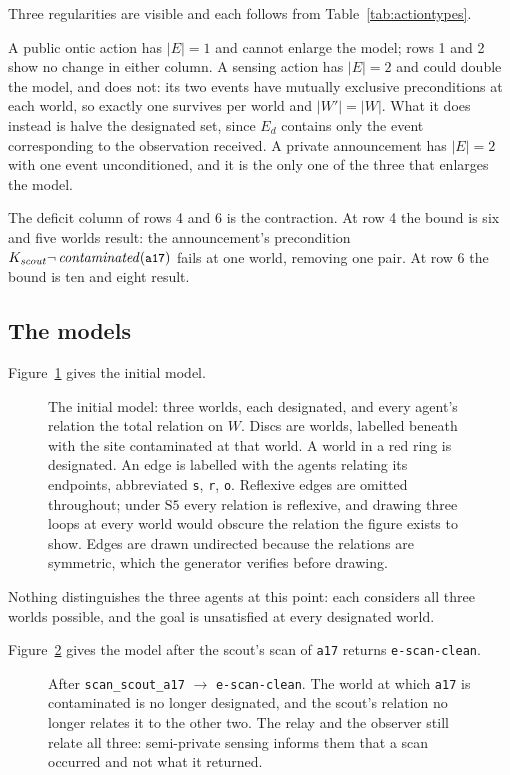 \documentclass[11pt,a4paper]{article}
\theoremstyle{definition}
\newcommand{\Kop}[1]{K_{#1}}
\newcommand{\code}[1]{\texttt{\small #1}}
\newcommand{\site}[1]{\code{#1}}
\begin{document}
Three regularities are visible and each follows from
Table~\ref{tab:actiontypes}.

A public ontic action has $|E| = 1$ and cannot enlarge the model; rows 1 and 2
show no change in either column. A sensing action has $|E| = 2$ and could
double the model, and does not: its two events have mutually exclusive
preconditions at each world, so exactly one survives per world and $|W'| =
|W|$. What it does instead is halve the designated set, since $E_d$ contains
only the event corresponding to the observation received. A private
announcement has $|E| = 2$ with one event unconditioned, and it is the only one
of the three that enlarges the model.

The deficit column of rows 4 and 6 is the contraction. At row 4 the bound is
six and five worlds result: the announcement's precondition
$\Kop{\mathit{scout}}\neg\,\mathit{contaminated}(\site{a17})$ fails at one
world, removing one pair. At row 6 the bound is ten and eight result.

\subsection{The models}

Figure~\ref{fig:kripke0} gives the initial model.

\begin{figure}[H]
\centering

\caption{The initial model: three worlds, each designated, and every agent's
relation the total relation on $W$. Discs are worlds, labelled beneath with the
site contaminated at that world. A world in a red ring is designated. An edge
is labelled with the agents relating its endpoints, abbreviated
\code{s}, \code{r}, \code{o}. Reflexive edges are omitted throughout; under
$\mathrm{S5}$ every relation is reflexive, and drawing three loops at every
world would obscure the relation the figure exists to show. Edges are drawn
undirected because the relations are symmetric, which the generator verifies
before drawing.}
\label{fig:kripke0}
\end{figure}

Nothing distinguishes the three agents at this point: each considers all three
worlds possible, and the goal is unsatisfied at every designated world.

Figure~\ref{fig:kripke3} gives the model after the scout's scan of \site{a17}
returns \code{e-scan-clean}.

\begin{figure}[H]
\centering

\caption{After \code{scan\_scout\_a17} $\to$ \code{e-scan-clean}. The world at
which \site{a17} is contaminated is no longer designated, and the scout's
relation no longer relates it to the other two. The relay and the observer
still relate all three: semi-private sensing informs them that a scan occurred
and not what it returned.}
\label{fig:kripke3}
\end{figure}
\end{document}
